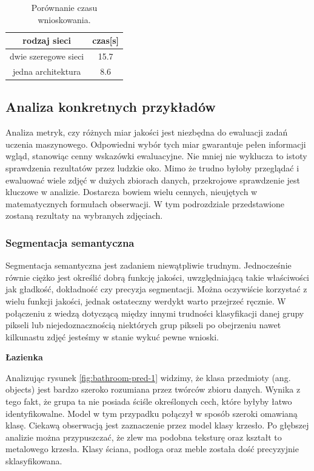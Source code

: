 \begin{table}[ht!]
    \centering
    \begin{tabular}{c|c}
        rodzaj sieci                      &   czas{[}s{]} \\ \hline
        dwie szeregowe sieci                  &   15.7\\
        jedna architektura               &   8.6
\end{tabular}
\caption{Porównanie czasu wnioskowania.}
\label{tab:por-infer}
\end{table}

\subsection{Analiza konkretnych przykładów}
Analiza metryk, czy różnych miar jakości jest niezbędna do ewaluacji zadań uczenia maszynowego. Odpowiedni wybór tych miar gwarantuje pełen informacji wgląd, stanowiąc cenny wskazówki ewaluacyjne. Nie mniej nie wyklucza to istoty sprawdzenia rezultatów przez ludzkie oko. Mimo że trudno byłoby przeglądać i ewaluować wiele zdjęć w dużych zbiorach danych, przekrojowe sprawdzenie jest kluczowe w analizie. Dostarcza bowiem wielu cennych, nieujętych w matematycznych formułach obserwacji. W tym podrozdziale przedstawione zostaną rezultaty na wybranych zdjęciach.
\subsubsection{Segmentacja semantyczna}
Segmentacja semantyczna jest zadaniem niewątpliwie trudnym. Jednocześnie równie ciężko jest określić dobrą funkcję jakości, uwzględniającą takie właściwości jak gładkość, dokładność czy precyzja segmentacji. Można oczywiście korzystać z wielu funkcji jakości, jednak ostateczny werdykt warto przejrzeć ręcznie. W połączeniu z wiedzą dotyczącą między innymi trudności klasyfikacji danej grupy pikseli lub niejedoznacznością niektórych grup pikseli po obejrzeniu nawet kilkunastu zdjęć jesteśmy w stanie wykuć pewne wnioski.

\noindent
\textbf{Łazienka}

Analizując rysunek \ref{fig:bathroom-pred-1} widzimy, że klasa przedmioty (ang. objects) jest bardzo szeroko rozumiana przez twórców zbioru danych. Wynika z tego fakt, że grupa ta nie posiada ściśle określonych cech, które byłyby łatwo identyfikowalne. Model w tym przypadku połączył w sposób szeroki omawianą klasę. Ciekawą obserwacją jest zaznaczenie przez model klasy krzesło. Po głębszej analizie można przypuszczać, że zlew ma podobna teksturę oraz kształt to metalowego krzesła. Klasy ściana, podłoga oraz meble została dość precyzyjnie sklasyfikowana.

